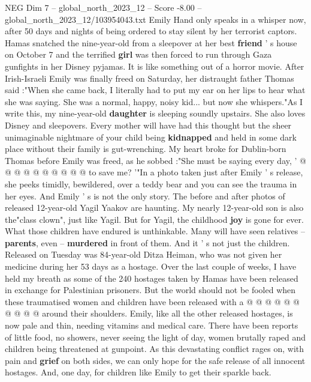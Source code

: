 \begin{textsample}{NEG Dim 7 – global\_north\_2023\_12 – Score -8.00 – global\_north\_2023\_12/103954043.txt}  \label{ex:f7_neg_148}
Emily Hand only speaks in a whisper now, after 50 days and nights of being ordered to stay silent by her terrorist captors.
Hamas snatched the nine-year-old from a sleepover at her best \textbf{friend} ' s house on October 7 and the terrified \textbf{girl} was then forced to run through Gaza gunfights in her Disney pyjamas.
It is like something out of a horror movie.
After Irish-Israeli Emily was finally freed on Saturday, her distraught father Thomas said :"When she came back, I literally had to put my ear on her lips to hear what she was saying.
She was a normal, happy, noisy kid... but now she whispers."As I write this, my nine-year-old \textbf{daughter} is sleeping soundly upstairs.
She also loves Disney and sleepovers.
Every mother will have had this thought but the sheer unimaginable nightmare of your child being \textbf{kidnapped} and held in some dark place without their family is gut-wrenching.
My heart broke for Dublin-born Thomas before Emily was freed, as he sobbed :"She must be saying every day, ' @ @ @ @ @ @ @ @ @ @ to save me? '"In a photo taken just after Emily ' s release, she peeks timidly, bewildered, over a teddy bear and you can see the trauma in her eyes.
And Emily ' s is not the only story.
The before and after photos of released 12-year-old Yagil Yaakov are haunting.
My nearly 12-year-old son is also the"class clown", just like Yagil.
But for Yagil, the childhood \textbf{joy} is gone for ever.
What those children have endured is unthinkable.
Many will have seen relatives -- \textbf{parents}, even -- \textbf{murdered} in front of them.
And it ' s not just the children.
Released on Tuesday was 84-year-old Ditza Heiman, who was not given her medicine during her 53 days as a hostage.
Over the last couple of weeks, I have held my breath as some of the 240 hostages taken by Hamas have been released in exchange for Palestinian prisoners.
But the world should not be fooled when these traumatised women and children have been released with a @ @ @ @ @ @ @ @ @ @ around their shoulders.
Emily, like all the other released hostages, is now pale and thin, needing vitamins and medical care.
There have been reports of little food, no showers, never seeing the light of day, women brutally raped and children being threatened at gunpoint.
As this devastating conflict rages on, with pain and \textbf{grief} on both sides, we can only hope for the safe release of all innocent hostages.
And, one day, for children like Emily to get their sparkle back.

\end{textsample}
